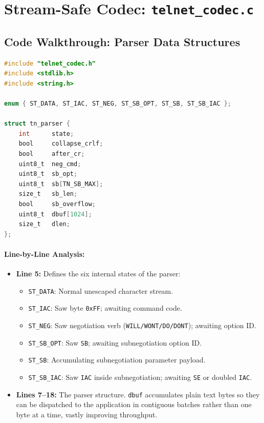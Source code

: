 \section{Stream-Safe Codec: \texttt{telnet\_codec.c}}

\subsection{Code Walkthrough: Parser Data Structures}

\begin{lstlisting}[language=C]
#include "telnet_codec.h"
#include <stdlib.h>
#include <string.h>

enum { ST_DATA, ST_IAC, ST_NEG, ST_SB_OPT, ST_SB, ST_SB_IAC };

struct tn_parser {
    int      state;
    bool     collapse_crlf;
    bool     after_cr;
    uint8_t  neg_cmd;
    uint8_t  sb_opt;
    uint8_t  sb[TN_SB_MAX];
    size_t   sb_len;
    bool     sb_overflow;
    uint8_t  dbuf[1024];
    size_t   dlen;
};
\end{lstlisting}

\paragraph{Line-by-Line Analysis:}
\begin{itemize}[leftmargin=1.5em]
    \item \textbf{Line 5:} Defines the six internal states of the parser:
    \begin{itemize}
        \item \texttt{ST\_DATA}: Normal unescaped character stream.
        \item \texttt{ST\_IAC}: Saw byte \texttt{0xFF}; awaiting command code.
        \item \texttt{ST\_NEG}: Saw negotiation verb (\texttt{WILL/WONT/DO/DONT}); awaiting option ID.
        \item \texttt{ST\_SB\_OPT}: Saw \texttt{SB}; awaiting subnegotiation option ID.
        \item \texttt{ST\_SB}: Accumulating subnegotiation parameter payload.
        \item \texttt{ST\_SB\_IAC}: Saw \texttt{IAC} inside subnegotiation; awaiting \texttt{SE} or doubled \texttt{IAC}.
    \end{itemize}
    \item \textbf{Lines 7--18:} The parser structure. \texttt{dbuf} accumulates plain text bytes so they can be dispatched to the application in contiguous batches rather than one byte at a time, vastly improving throughput.
\end{itemize}

